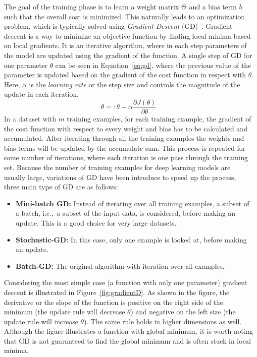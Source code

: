 The goal of the training phase is to learn a weight matrix $\Theta$ and a bias term $b$ such that the overall cost is minimized. This naturally leads to an optimization problem, which is  typically solved using \emph{Gradient Descent} (GD)~.
Gradient descent is a way to minimize an objective function by finding local minima based on local gradients.
It is an iterative algorithm, where in each step parameters of the model are updated using the gradient of the function. A single step of GD  for one parameter $\theta$ can be seen in Equation~\ref{eq:gd}, where the previous value of the parameter is updated based on the gradient of the cost function in respect with $\theta$. Here, $\alpha$ is the \emph{learning rate} or the step size and controls the magnitude of the update in each iteration. 
\begin{equation}
\theta=: \theta- \alpha\frac { \partial J(\theta) }{ \partial \theta }
\label{eq:gd}
\end{equation}
In a dataset with $m$ training examples, for each training example, the gradient of the cost function with respect to every weight and bias has to be calculated and accumulated.
After iterating through all the training examples the weights and bias terms will be updated by the accumulate sum. This process is repeated for some number of iterations, where each iteration is one pass through the training set. Because the number of training examples for deep learning models are usually large, variations of GD have been introduce to speed up the process, three main type of GD are as follows: 
\begin{itemize}
\item \textbf{Mini-batch GD:} Instead of iterating over all training examples, a subset of a batch, i.e.,\ a subset of the input data, is considered, before making an update. This is a good choice for very large datasets.
\item \textbf{Stochastic-GD:} In this case, only one example is looked at, before making an update. 
\item \textbf{Batch-GD:} The original algorithm with iteration over all examples. 
\end{itemize} 
Considering the most simple case (a function with only one parameter) gradient descent is illustrated in Figure~\ref{fig:gradientD}. As shown in the figure, the derivative or the slope of the function is positive on the right side of the minimum (the update rule will decrease $\theta$) and negative on the left size (the update rule will increase $\theta$). The same rule holds in higher dimensions as well. Although the figure illustrates a function with global minimum, it is worth noting that GD is not guaranteed to find the global minimum and is often stuck in local minima.\\
